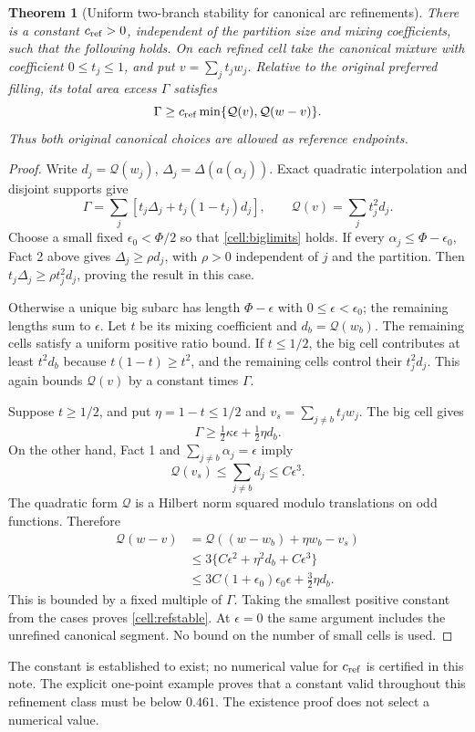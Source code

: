 \documentclass[11pt]{article}
\newtheorem{theorem}{Theorem}[section]
\theoremstyle{remark}\newtheorem{remark}[theorem]{Remark}
\newcommand{\Q}{\mathcal Q}
\begin{document}
\begin{theorem}[Uniform two-branch stability for canonical arc refinements]\label{cell:main}
There is a constant $c_{\rm ref}>0$, independent of the partition size and mixing coefficients, such that the following holds. On each refined cell take the canonical mixture with coefficient $0\leq t_j\leq1$, and put
$v=\sum_jt_jw_j$. Relative to the original preferred filling, its total area excess $\Gamma$ satisfies
\begin{equation}\label{cell:refstable}
 \Gamma\geq c_{\rm ref}\min\{\Q(v),\Q(w-v)\}.
\end{equation}
Thus both original canonical choices are allowed as reference endpoints.
\end{theorem}
\begin{proof}
Write $d_j=\Q(w_j)$, $\Delta_j=\Delta(a(\alpha_j))$. Exact quadratic interpolation and disjoint supports give
\begin{equation}\label{cell:sums}
 \Gamma=\sum_j[t_j\Delta_j+t_j(1-t_j)d_j],\qquad
 \Q(v)=\sum_jt_j^2d_j.
\end{equation}
Choose a small fixed $\epsilon_0<\Phi/2$ so that \eqref{cell:biglimits} holds.
If every $\alpha_j\leq\Phi-\epsilon_0$, Fact 2 above gives
$\Delta_j\geq\rho d_j$, with $\rho>0$ independent of $j$ and the partition. Then $t_j\Delta_j\geq\rho t_j^2d_j$, proving the result in this case.

Otherwise a unique big subarc has length $\Phi-\epsilon$ with $0\leq\epsilon<\epsilon_0$; the remaining lengths sum to $\epsilon$. Let $t$ be its mixing coefficient and $d_b=\Q(w_b)$. The remaining cells satisfy a uniform positive ratio bound. If $t\leq1/2$, the big cell contributes at least $t^2d_b$ because $t(1-t)\geq t^2$, and the remaining cells control their $t_j^2d_j$. This again bounds $\Q(v)$ by a constant times $\Gamma$.

Suppose $t\geq1/2$, and put $\eta=1-t\leq1/2$ and
$v_s=\sum_{j\ne b}t_jw_j$. The big cell gives
\[
 \Gamma\geq\tfrac12\kappa\epsilon+\tfrac12\eta d_b.
\]
On the other hand, Fact 1 and $\sum_{j\ne b}\alpha_j=\epsilon$ imply
\[
 \Q(v_s)\leq\sum_{j\ne b}d_j\leq C\epsilon^3.
\]
The quadratic form $\Q$ is a Hilbert norm squared modulo translations on odd functions. Therefore
\begin{align*}
 \Q(w-v)
 &=\Q((w-w_b)+\eta w_b-v_s)\\
 &\leq3\{C\epsilon^2+\eta^2d_b+C\epsilon^3\}\\
 &\leq3C(1+\epsilon_0)\epsilon_0\epsilon+\tfrac32\eta d_b.
\end{align*}
This is bounded by a fixed multiple of $\Gamma$. Taking the smallest positive constant from the cases proves \eqref{cell:refstable}. At $\epsilon=0$ the same argument includes the unrefined canonical segment. No bound on the number of small cells is used.
\end{proof}
The constant is established to exist; no numerical value for $c_{\rm ref}$ is certified in this note. The explicit one-point example proves that a constant valid throughout this refinement class must be below $0.461$. The existence proof does not select a numerical value.
\end{document}
